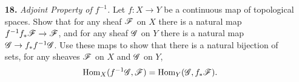 \documentclass{article}
\begin{document}
\begin{enumerate} [label=\textbf{\arabic*.}, leftmargin=0em]
\begin{proof}
    We first identify the restriction maps of $i_P(A)$. Let $U \subseteq V$ be open subsets of $X$, then $i_P(A)(V) \to i_P(A)(U)$ is the zero map if either $V$ or $U$ (hence $V$ as well) does not contain $P$, and is the identity map if both $V$ and $U$ contain $P$. If $Q \in \overline{\{ P \} }$, then every open neighborhood of $Q$ contains $P$, so the direct system of open neighborhoods of $Q$ induces the direct system consisting of a copy of $A$ for every $U \ni Q$ with the identity map as transition maps, hence $(i_P(A))_Q = A$. If $Q \notin \overline{\{P \} }$, then there exists an open neighborhood $W$ of $Q$ not containing $P$, which means $i_P(A)(W) = 0$, hence $(i_P(A))_Q = 0$. The last statement is obvious.
\end{proof}

\item[\textbf{18.}] \textit{Adjoint Property of $f^{-1}$.} Let $f : X \to Y$ be a continuous map of topological spaces. Show that for any sheaf $\mathscr{F}$ on $X$ there is a natural map $f^{-1} f_* \mathscr{F} \to \mathscr{F}$, and for any sheaf $\mathscr{G}$ on $Y$ there is a natural map $\mathscr{G} \to f_* f^{-1} \mathscr{G}$. Use these maps to show that there is a natural bijection of sets, for any sheaves $\mathscr{F}$ on $X$ and $\mathscr{G}$ on $Y$,
\begin{equation*}
    \operatorname{Hom}_X(f^{-1}\mathscr{G}, \mathscr{F}) = \operatorname{Hom}_Y(\mathscr{G}, f_*\mathscr{F}).
\end{equation*}


\end{enumerate}
\end{document}
